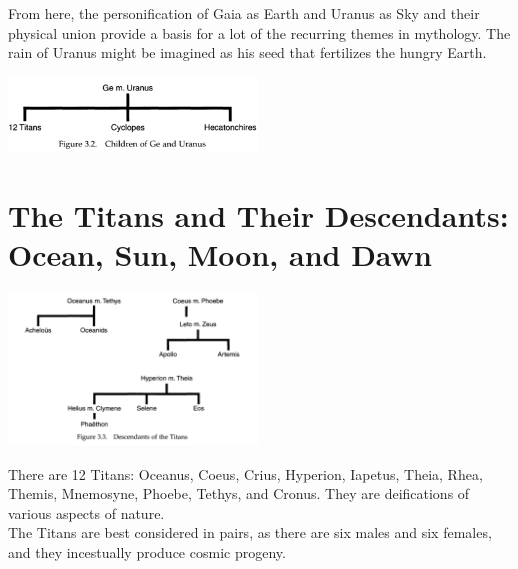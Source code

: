 \documentclass[11pt]{article}
\begin{document}
From here, the personification of Gaia as Earth and Uranus as Sky and their physical union provide a basis for a lot of the recurring themes in mythology. The rain of Uranus might be imagined as his seed that fertilizes the hungry Earth.

\begin{center}
\includegraphics[width=250]{./children-of-ge-and-uranus.png}
\end{center}

\section*{The Titans and Their Descendants: Ocean, Sun, Moon, and Dawn}
\label{sec:orgea94816}

\begin{center}
\includegraphics[width=250]{./descendants-of-the-titans.png}
\end{center}

There are 12 Titans: Oceanus, Coeus, Crius, Hyperion, Iapetus, Theia, Rhea, Themis, Mnemosyne, Phoebe, Tethys, and Cronus. They are deifications of various aspects of nature.\\

The Titans are best considered in pairs, as there are six males and six females, and they incestually produce cosmic progeny.
\end{document}

